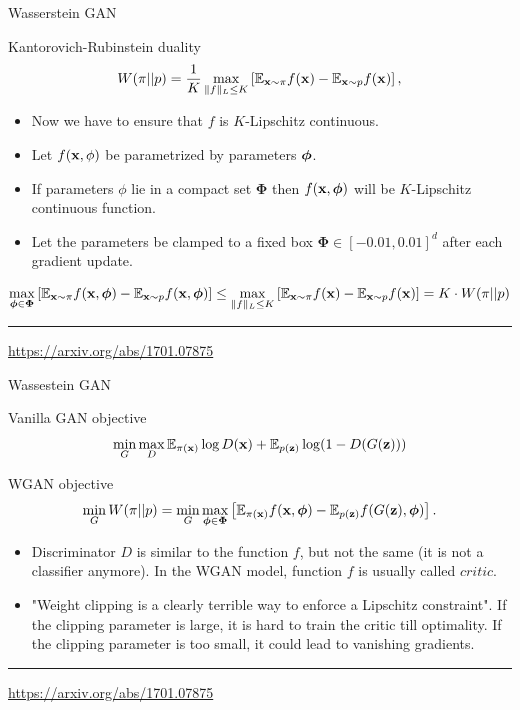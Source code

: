 \begin{frame}{Wasserstein GAN}
		\begin{block}{Kantorovich-Rubinstein duality}
		\[
			W(\pi || p) = \frac{1}{K} \max_{\| f \|_L \leq K} \left[ \mathbb{E}_{\mathbf{x} \sim \pi} f(\mathbf{x})  - \mathbb{E}_{\mathbf{x} \sim p} f(\mathbf{x})\right],
		\]
	\end{block}
	\begin{itemize}
		\item Now we have to ensure that $f$ is $K$-Lipschitz continuous.
		\item Let $f(\mathbf{x}, \phi)$ be parametrized by parameters $\boldsymbol{\phi}$.
		\item If parameters $\phi$ lie in a compact set $\boldsymbol{\Phi}$ then $f(\mathbf{x}, \boldsymbol{\phi})$ will be $K$-Lipschitz continuous function. 
		\item Let the parameters be clamped to a fixed box $\boldsymbol{\Phi} \in [-0.01, 0.01]^d$ after each gradient update.
	\end{itemize}
	{\footnotesize
	\[
		 \max_{\boldsymbol{\phi} \in \boldsymbol{\Phi}} \left[ \mathbb{E}_{\mathbf{x} \sim \pi} f(\mathbf{x}, \boldsymbol{\phi})  - \mathbb{E}_{\mathbf{x} \sim p} f(\mathbf{x}, \boldsymbol{\phi} )\right] \leq  \max_{\| f \|_L \leq K} \left[ \mathbb{E}_{\mathbf{x} \sim \pi} f(\mathbf{x})  - \mathbb{E}_{\mathbf{x} \sim p} f(\mathbf{x})\right] = K \cdot W(\pi || p)
	\]}
	\vfill
	\hrule\medskip 
	{\scriptsize \href{https://arxiv.org/abs/1701.07875}{https://arxiv.org/abs/1701.07875}}
\end{frame}
\begin{frame}{Wassestein GAN}
	\begin{block}{Vanilla GAN objective}
		\vspace{-0.3cm}
		\[
			\min_{G} \max_D \mathbb{E}_{\pi(\mathbf{x})} \log D(\mathbf{x}) + \mathbb{E}_{p(\mathbf{z})} \log (1 - D(G(\mathbf{z})))
		\]
	\end{block}
	\begin{block}{WGAN objective}
		\vspace{-0.6cm}
		\[
		\min_{G} W(\pi || p) = \min_{G} \max_{\boldsymbol{\phi} \in \boldsymbol{\Phi}} \left[ \mathbb{E}_{\pi(\mathbf{x})} f(\mathbf{x}, \boldsymbol{\phi})  - \mathbb{E}_{p(\mathbf{z})} f(G(\mathbf{z}), \boldsymbol{\phi} )\right].
		\]
	\end{block}
	\begin{itemize}
		\item Discriminator $D$ is similar to the function $f$, but not the same (it is not a classifier anymore). In the WGAN model, function $f$ is usually called $\textit{critic}$.
		\item "Weight clipping is a clearly terrible way to enforce a Lipschitz constraint". If the clipping parameter is large, it is hard to train the critic till optimality. If the clipping parameter is too small, it could lead to vanishing gradients.
	\end{itemize}
	\vfill
	\hrule\medskip 
	{\scriptsize \href{https://arxiv.org/abs/1701.07875}{https://arxiv.org/abs/1701.07875}}
\end{frame}
